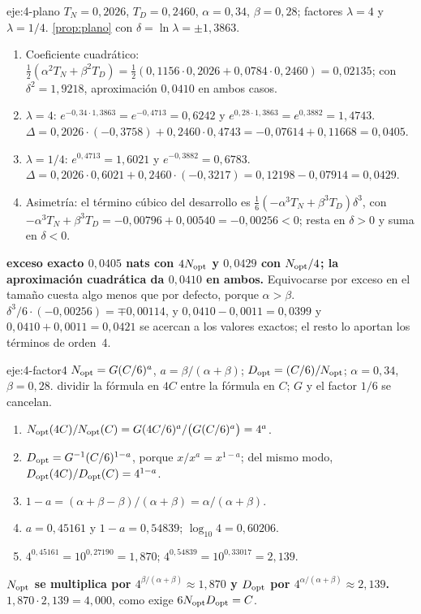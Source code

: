 \begin{solucion}{eje:4-plano}
\datos $T_N=0{,}2026$, $T_D=0{,}2460$, $\alpha=0{,}34$, $\beta=0{,}28$; factores $\lambda=4$ y $\lambda=1/4$.
\planteamiento \cref{prop:plano} con $\delta=\ln\lambda=\pm 1{,}3863$.
\pasos
\begin{enumerate}[label=\arabic*.]
  \item Coeficiente cuadrático: $\tfrac12(\alpha^{2}T_N+\beta^{2}T_D)=\tfrac12(0{,}1156\cdot 0{,}2026+0{,}0784\cdot 0{,}2460)=0{,}02135$; con $\delta^{2}=1{,}9218$, aproximación $0{,}0410$ en ambos casos.
  \item $\lambda=4$: $e^{-0{,}34\cdot 1{,}3863}=e^{-0{,}4713}=0{,}6242$ y $e^{0{,}28\cdot 1{,}3863}=e^{0{,}3882}=1{,}4743$. $\Delta=0{,}2026\cdot(-0{,}3758)+0{,}2460\cdot 0{,}4743=-0{,}07614+0{,}11668=0{,}0405$.
  \item $\lambda=1/4$: $e^{0{,}4713}=1{,}6021$ y $e^{-0{,}3882}=0{,}6783$. $\Delta=0{,}2026\cdot 0{,}6021+0{,}2460\cdot(-0{,}3217)=0{,}12198-0{,}07914=0{,}0429$.
  \item Asimetría: el término cúbico del desarrollo es $\tfrac16(-\alpha^{3}T_N+\beta^{3}T_D)\delta^{3}$, con $-\alpha^{3}T_N+\beta^{3}T_D=-0{,}00796+0{,}00540=-0{,}00256<0$; resta en $\delta>0$ y suma en $\delta<0$.
\end{enumerate}
\resultado \textbf{exceso exacto $0{,}0405$ nats con $4N_{\mathrm{opt}}$ y $0{,}0429$ con $N_{\mathrm{opt}}/4$; la aproximación cuadrática da $0{,}0410$ en ambos.} Equivocarse por exceso en el tamaño cuesta algo menos que por defecto, porque $\alpha>\beta$.
\comprobacion $\delta^{3}/6\cdot(-0{,}00256)=\mp 0{,}00114$, y $0{,}0410-0{,}0011=0{,}0399$ y $0{,}0410+0{,}0011=0{,}0421$ se acercan a los valores exactos; el resto lo aportan los términos de orden~4.
\end{solucion}

\begin{solucion}{eje:4-factor4}
\datos $N_{\mathrm{opt}}=G(C/6)^{a}$, $a=\beta/(\alpha+\beta)$; $D_{\mathrm{opt}}=(C/6)/N_{\mathrm{opt}}$; $\alpha=0{,}34$, $\beta=0{,}28$.
\planteamiento dividir la fórmula en $4C$ entre la fórmula en $C$; $G$ y el factor $1/6$ se cancelan.
\pasos
\begin{enumerate}[label=\arabic*.]
  \item $N_{\mathrm{opt}}(4C)/N_{\mathrm{opt}}(C)=G(4C/6)^{a}/\bigl(G(C/6)^{a}\bigr)=4^{a}$.
  \item $D_{\mathrm{opt}}=G^{-1}(C/6)^{1-a}$, porque $x/x^{a}=x^{1-a}$; del mismo modo, $D_{\mathrm{opt}}(4C)/D_{\mathrm{opt}}(C)=4^{1-a}$.
  \item $1-a=(\alpha+\beta-\beta)/(\alpha+\beta)=\alpha/(\alpha+\beta)$.
  \item $a=0{,}45161$ y $1-a=0{,}54839$; $\log_{10}4=0{,}60206$.
  \item $4^{0{,}45161}=10^{0{,}27190}=1{,}870$; $4^{0{,}54839}=10^{0{,}33017}=2{,}139$.
\end{enumerate}
\resultado \textbf{$N_{\mathrm{opt}}$ se multiplica por $4^{\beta/(\alpha+\beta)}\approx 1{,}870$ y $D_{\mathrm{opt}}$ por $4^{\alpha/(\alpha+\beta)}\approx 2{,}139$.}
\comprobacion $1{,}870\cdot 2{,}139=4{,}000$, como exige $6N_{\mathrm{opt}}D_{\mathrm{opt}}=C$.
\end{solucion}

